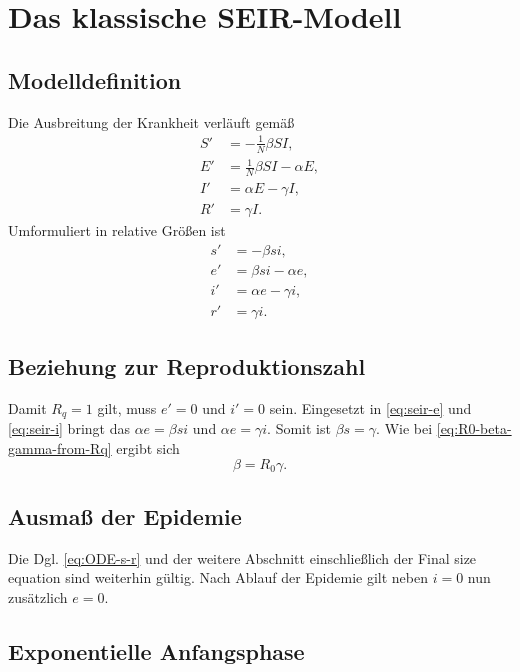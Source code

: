 \documentclass[a4paper,10pt,fleqn,twocolumn,twoside,dvipdfmx]{scrartcl}
\numberwithin{equation}{section}
\begin{document}
\section{Das klassische SEIR-Modell}

\subsection{Modelldefinition}
Die Ausbreitung der Krankheit verläuft gemäß%
\begin{align}
S' &= -\tfrac{1}{N} \beta SI,\\
E' &= \tfrac{1}{N} \beta SI - \alpha E,\\
I' &= \alpha E - \gamma I,\\
R' &= \gamma I.
\end{align}
Umformuliert in relative Größen ist
\begin{align}
\label{eq:seir-s} s' &= - \beta si,\\
\label{eq:seir-e} e' &= \beta si - \alpha e,\\
\label{eq:seir-i} i' &= \alpha e - \gamma i,\\
\label{eq:seir-r} r' &= \gamma i.
\end{align}

\subsection{Beziehung zur Reproduktionszahl}

Damit $R_q=1$ gilt, muss $e'=0$ und $i'=0$ sein. Eingesetzt in
\eqref{eq:seir-e} und \eqref{eq:seir-i} bringt das $\alpha e=\beta si$
und $\alpha e = \gamma i$. Somit ist $\beta s = \gamma$. Wie
bei \eqref{eq:R0-beta-gamma-from-Rq} ergibt sich
\begin{equation}
\beta = R_0\gamma.
\end{equation}

\subsection{Ausmaß der Epidemie}

Die Dgl. \eqref{eq:ODE-s-r} und der weitere Abschnitt
einschließlich der Final size equation sind weiterhin gültig.
Nach Ablauf der Epidemie gilt neben $i=0$ nun zusätzlich $e=0$.

\subsection{Exponentielle Anfangsphase}
\end{document}
